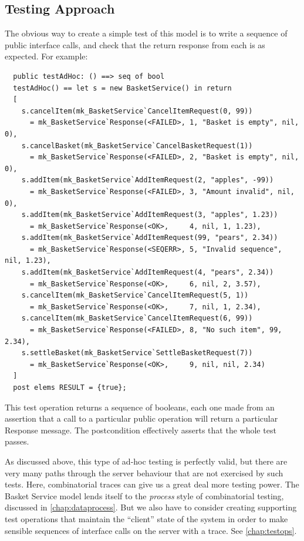 \documentclass{overturerepchap}
\begin{document}
\subsection{Testing Approach}

The obvious way to create a simple test of this model is to write a sequence of
public interface calls, and check that the return response from each is as
expected. For example:

\scriptsize
\begin{lstlisting}
  public testAdHoc: () ==> seq of bool
  testAdHoc() == let s = new BasketService() in return
  [
    s.cancelItem(mk_BasketService`CancelItemRequest(0, 99))
      = mk_BasketService`Response(<FAILED>, 1, "Basket is empty", nil, 0),
    s.cancelBasket(mk_BasketService`CancelBasketRequest(1))
      = mk_BasketService`Response(<FAILED>, 2, "Basket is empty", nil, 0),
    s.addItem(mk_BasketService`AddItemRequest(2, "apples", -99))
      = mk_BasketService`Response(<FAILED>, 3, "Amount invalid", nil, 0),
    s.addItem(mk_BasketService`AddItemRequest(3, "apples", 1.23))
      = mk_BasketService`Response(<OK>,     4, nil, 1, 1.23),
    s.addItem(mk_BasketService`AddItemRequest(99, "pears", 2.34))
      = mk_BasketService`Response(<SEQERR>, 5, "Invalid sequence", nil, 1.23),
    s.addItem(mk_BasketService`AddItemRequest(4, "pears", 2.34))
      = mk_BasketService`Response(<OK>,     6, nil, 2, 3.57),
    s.cancelItem(mk_BasketService`CancelItemRequest(5, 1))
      = mk_BasketService`Response(<OK>,     7, nil, 1, 2.34),
    s.cancelItem(mk_BasketService`CancelItemRequest(6, 99))
      = mk_BasketService`Response(<FAILED>, 8, "No such item", 99, 2.34),
    s.settleBasket(mk_BasketService`SettleBasketRequest(7))
      = mk_BasketService`Response(<OK>,     9, nil, nil, 2.34)
  ]
  post elems RESULT = {true};
\end{lstlisting}
\normalsize

\noindent This test operation returns a sequence of booleans, each one made from
an assertion that a call to a particular public operation will return a particular
Response message. The postcondition effectively asserts that the whole test
passes.

As discussed above, this type of ad-hoc testing is perfectly valid, but there
are very many paths through the server behaviour that are not exercised by such
tests. Here, combinatorial traces can give us a great deal more testing power.
The Basket Service model lends itself to the \emph{process} style of
combinatorial testing, discussed in \ref{chap:dataprocess}. But we also have to
consider creating supporting test operations that maintain the ``client'' state
of the system in order to make sensible sequences of interface calls on the
server with a trace. See \ref{chap:testops}.
\end{document}
